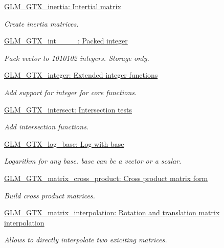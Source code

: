 \begin{DoxyCompactItemize}
\hyperlink{group__gtx__inertia}{\-G\-L\-M\-\_\-\-G\-T\-X\-\_\-inertia\-: Intertial matrix}
\begin{DoxyCompactList}\small\item\em \-Create inertia matrices. \end{DoxyCompactList}\item 
\hyperlink{group__gtx__int__10__10__10__2}{\-G\-L\-M\-\_\-\-G\-T\-X\-\_\-int\-\_\-\_\-\_\-\_\-: Packed integer}
\begin{DoxyCompactList}\small\item\em \-Pack vector to 1010102 integers. \-Storage only. \end{DoxyCompactList}\item 
\hyperlink{group__gtx__integer}{\-G\-L\-M\-\_\-\-G\-T\-X\-\_\-integer\-: Extended integer functions}
\begin{DoxyCompactList}\small\item\em \-Add support for integer for core functions. \end{DoxyCompactList}\item 
\hyperlink{group__gtx__intersect}{\-G\-L\-M\-\_\-\-G\-T\-X\-\_\-intersect\-: Intersection tests}
\begin{DoxyCompactList}\small\item\em \-Add intersection functions. \end{DoxyCompactList}\item 
\hyperlink{group__gtx__log__base}{\-G\-L\-M\-\_\-\-G\-T\-X\-\_\-log\-\_\-base\-: Log with base}
\begin{DoxyCompactList}\small\item\em \-Logarithm for any base. base can be a vector or a scalar. \end{DoxyCompactList}\item 
\hyperlink{group__gtx__matrix__cross__product}{\-G\-L\-M\-\_\-\-G\-T\-X\-\_\-matrix\-\_\-cross\-\_\-product\-: Cross product matrix form}
\begin{DoxyCompactList}\small\item\em \-Build cross product matrices. \end{DoxyCompactList}\item 
\hyperlink{group__gtx__matrix__interpolation}{\-G\-L\-M\-\_\-\-G\-T\-X\-\_\-matrix\-\_\-interpolation\-: Rotation and translation matrix interpolation}
\begin{DoxyCompactList}\small\item\em \-Allows to directly interpolate two exiciting matrices. \end{DoxyCompactList}\item 

\end{DoxyCompactItemize}
